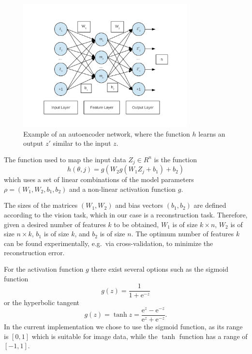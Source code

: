\documentclass[runningheads]{llncs}
\begin{document}
\begin{figure}
\begin{center}
\includegraphics[width = 0.8\textwidth]{autoencoder}
\end{center}
\caption{Example of an autoencoder network, where the function $h$ learns an output $z'$ similar to the input $z$.}
\label{fig:autoencoder}
\end{figure}

The function used to map the input data $Z_j\in R^n$ is the function
\begin{equation}
 h(\theta,j)= g(W_2 g(W_1 Z_j+b_1)+b_2)
\end{equation}
which uses a set of linear combinations of the model parameters 
$\rho=(W_1,W_2,b_1,b_2)$ and a non-linear activation function $g$.

The sizes of the matrices $(W_1,W_2)$ and bias vectors $(b_1,b_2)$ are defined according to the vision task, which in our case is a reconstruction task. Therefore, given a desired number of features $k$ to be obtained, $W_1$ is of size $k\times n$, $W_2$ is of size $n\times k$, $b_1$ is of size $k$, and $b_2$ is of size $n$. The optimum number of features $k$ can be found experimentally, e.g.\ via cross-validation, to minimize the reconstruction error.

For the activation function $g$ there exist several options such as the sigmoid function
\begin{equation}
  g(z)=\frac{1}{1+\text{e}^{-z}}
\end{equation}
or the hyperbolic tangent
\begin{equation}
  g(z)=\tanh z=\frac{\text{e}^z-\text{e}^{-z}}{\text{e}^z+\text{e}^{-z}}.
\end{equation}
In the current implementation we chose to use the sigmoid function, as its range is $[0,1]$ which is suitable for image data, while the $\tanh$ function has a range of $[-1,1]$.
\end{document}
